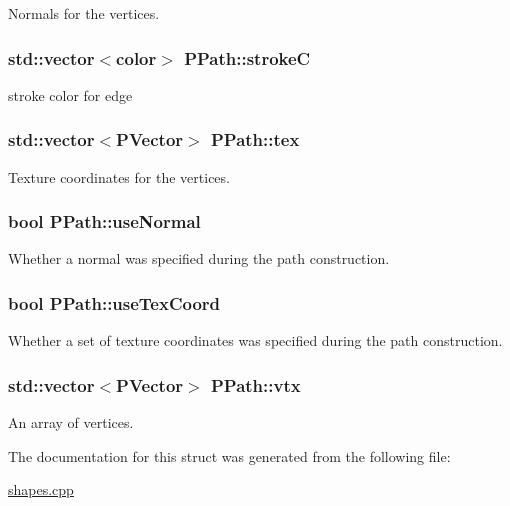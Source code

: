 \-Normals for the vertices. 

\hypertarget{structPPath_a9617b499180498fafdb36f206b9e4831}{
\subsubsection[{stroke\-C}]{\setlength{\rightskip}{0pt plus 5cm}std\-::vector$<${\bf color}$>$ {\bf \-P\-Path\-::stroke\-C}}}\label{structPPath_a9617b499180498fafdb36f206b9e4831}


stroke color for edge 

\hypertarget{structPPath_acda3dc5da7e49ceab397ba6d69190196}{
\subsubsection[{tex}]{\setlength{\rightskip}{0pt plus 5cm}std\-::vector$<${\bf \-P\-Vector}$>$ {\bf \-P\-Path\-::tex}}}\label{structPPath_acda3dc5da7e49ceab397ba6d69190196}


\-Texture coordinates for the vertices. 

\hypertarget{structPPath_ac87e8c7b45a255bef6b26a8d01561d68}{
\subsubsection[{use\-Normal}]{\setlength{\rightskip}{0pt plus 5cm}bool {\bf \-P\-Path\-::use\-Normal}}}\label{structPPath_ac87e8c7b45a255bef6b26a8d01561d68}


\-Whether a normal was specified during the path construction. 

\hypertarget{structPPath_aa6f1ee80b0ac2af7dd7196e5b3f65a96}{
\subsubsection[{use\-Tex\-Coord}]{\setlength{\rightskip}{0pt plus 5cm}bool {\bf \-P\-Path\-::use\-Tex\-Coord}}}\label{structPPath_aa6f1ee80b0ac2af7dd7196e5b3f65a96}


\-Whether a set of texture coordinates was specified during the path construction. 

\hypertarget{structPPath_a155917dd334970ab34db0d305d7d35ca}{
\subsubsection[{vtx}]{\setlength{\rightskip}{0pt plus 5cm}std\-::vector$<${\bf \-P\-Vector}$>$ {\bf \-P\-Path\-::vtx}}}\label{structPPath_a155917dd334970ab34db0d305d7d35ca}


\-An array of vertices. 



\-The documentation for this struct was generated from the following file\-:\begin{DoxyCompactItemize}
\item 
\hyperlink{shapes_8cpp}{shapes.\-cpp}\end{DoxyCompactItemize}
